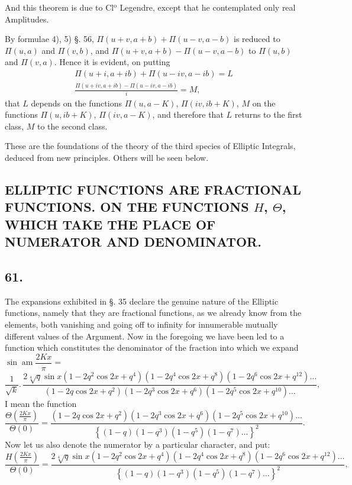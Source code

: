 \documentclass{article}
\begin{document}
And this theorem  is due to Cl$^{\mathrm{o}}$ Legendre, except that he contemplated only real Amplitudes.

By formulae 4), 5) §. 56, $\Pi(u+v,a+b)+\Pi(u-v,a-b)$ is reduced to $\Pi(u,a)$ and $\Pi(v,b)$, and $\Pi(u+v,a+b)-\Pi(u-v,a-b)$ to $\Pi(u,b)$ and $\Pi(v,a)$. Hence it is evident, on putting
\[
\begin{gathered}
\Pi(u+i,a+ib)+\Pi(u-iv,a-ib)=L\\[1.5ex]
\frac{\Pi(u+iv,a+ib)-\Pi(u-iv,a-ib)}{i}=M,
\end{gathered}
\]
that $L$ depends on the functions $\Pi(u,a-K)$, $\Pi(iv,ib+K)$, $M$ on the functions $\Pi(u,ib+K)$, $\Pi(iv,a-K)$, and therefore that $L$ returns to the first class, $M$ to the second class.

These are the foundations of the theory of the third species of Elliptic Integrals, deduced from new principles. Others will be seen below.

\subsection*{ELLIPTIC FUNCTIONS ARE FRACTIONAL FUNCTIONS. ON THE FUNCTIONS $H$, $\Theta$, WHICH TAKE THE PLACE OF NUMERATOR AND DENOMINATOR.}

\subsection*{61.}

The expansions exhibited in §. 35 declare the genuine nature of the Elliptic functions, namely that they are fractional functions, as we already know from the elements, both vanishing and going off to infinity for innumerable mutually different values of the Argument. Now in the foregoing we have been led to a function which constitutes the denominator of the fraction into which we expand $\sin\operatorname{am}\dfrac{2Kx}{\pi}=$
\[
\frac{1}{\sqrt{k}}.\,\frac{2\sqrt[4]{q}\sin x(1-2q^{2}\cos 2x+q^{4})(1-2q^{4}\cos 2x+q^{8})(1-2q^{6}\cos 2x+q^{12})\ldots}{(1-2q\cos 2x+q^{2})(1-2q^{3}\cos 2x+q^{6})(1-2q^{5}\cos 2x+q^{10})\ldots},
\]
I mean the function
\[
\frac{\Theta\left(\frac{2Kx}{\pi}\right)}{\Theta(0)}=\frac{(1-2q\cos 2x+q^{2})(1-2q^{3}\cos 2x+q^{6})(1-2q^{5}\cos 2x+q^{10})\ldots}{\left\{(1-q)(1-q^{3})(1-q^{5})(1-q^{7})\ldots\right\}^{2}}.
\]
Now let us also denote the numerator by a particular character, and put:
\[
\frac{H\left(\frac{2Kx}{\pi}\right)}{\Theta(0)}=\frac{2\sqrt[4]{q}\sin x(1-2q^{2}\cos 2x+q^{4})(1-2q^{4}\cos 2x+q^{8})(1-2q^{6}\cos 2x+q^{12})\ldots}{\left\{(1-q)(1-q^{3})(1-q^{5})(1-q^{7})\ldots\right\}^{2}},
\]
\end{document}
